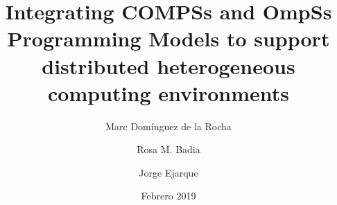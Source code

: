 \documentclass[a4paper]{article}
\title{Integrating COMPSs and OmpSs Programming Models to support distributed heterogeneous computing environments}
\author
{
Marc Domínguez de la Rocha
\and
Rosa M. Badia
\and
Jorge Ejarque
}
\date{Febrero 2019}
\begin{document}
\maketitle

\newpage
\renewcommand{\contentsname}{Índice}
\tableofcontents
\newpage





\nocite{*}
\end{document}
